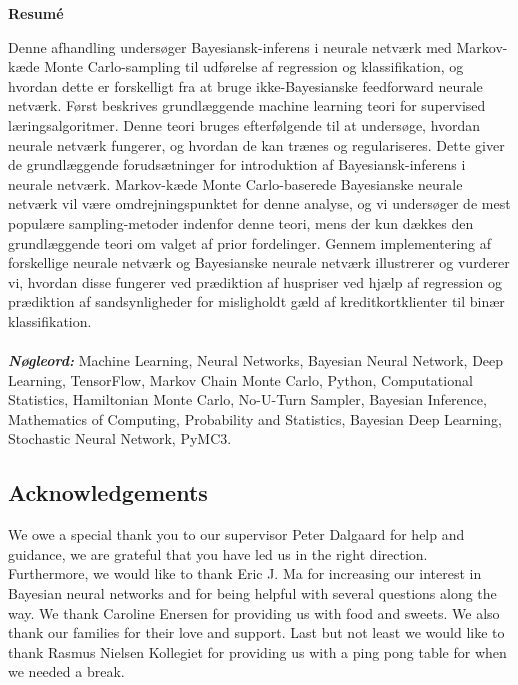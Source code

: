 \documentclass[a4paper, titlepage, openright]{book}
\providecommand{\nogleord}[1]
{
  \small	
  \textbf{\textit{Nøgleord:}} #1
}
\numberwithin{mytheorem}{chapter}
\numberwithin{equation}{section}
\begin{document}
\clearpage
\thispagestyle{empty}
\begin{center}
    \Large
    \textbf{Resumé}
\end{center}
\vspace{0.9cm}
Denne afhandling undersøger Bayesiansk-inferens i neurale netværk med Markov-kæde Monte Carlo-sampling til udførelse af regression og klassifikation, og hvordan dette er forskelligt fra at bruge ikke-Bayesianske feedforward neurale netværk. Først beskrives grundlæggende machine learning teori for supervised læringsalgoritmer. Denne teori bruges efterfølgende til at undersøge, hvordan neurale netværk fungerer, og hvordan de kan trænes og regulariseres. Dette giver de grundlæggende forudsætninger for introduktion af Bayesiansk-inferens i neurale netværk. Markov-kæde Monte Carlo-baserede Bayesianske neurale netværk vil være omdrejningspunktet for denne analyse, og vi undersøger de mest populære sampling-metoder indenfor denne teori, mens der kun dækkes den grundlæggende teori om valget af prior fordelinger. Gennem implementering af forskellige neurale netværk og Bayesianske neurale netværk illustrerer og vurderer vi, hvordan disse fungerer ved prædiktion af huspriser ved hjælp af regression og prædiktion af sandsynligheder for misligholdt gæld af kreditkortklienter til binær klassifikation.
\\
\\
\nogleord{Machine Learning, Neural Networks, Bayesian Neural Network, Deep Learning, TensorFlow, Markov Chain Monte Carlo, Python, Computational Statistics, Hamiltonian Monte Carlo, No-U-Turn Sampler, Bayesian Inference, Mathematics of Computing, Probability and Statistics, Bayesian Deep Learning, Stochastic Neural Network, PyMC3.}

\clearpage
\thispagestyle{empty}
\begin{center}
\section*{Acknowledgements}
\end{center}
We owe a special thank you to our supervisor Peter Dalgaard for help and guidance, we are grateful that you have led us in the right direction. Furthermore, we would like to thank Eric J. Ma for increasing our interest in Bayesian neural networks and for being helpful with several questions along the way. We thank Caroline Enersen for providing us with food and sweets. We also thank our families for their love and support. Last but not least we would like to thank Rasmus Nielsen Kollegiet for providing us with a ping pong table for when we needed a break.
\newpage
\end{document}
